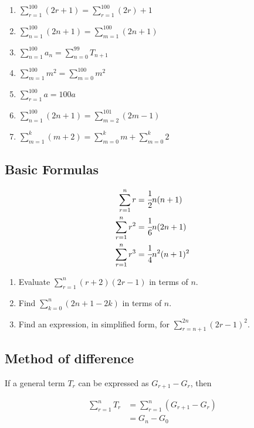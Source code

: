 \documentclass[letterpaper]{article}
\begin{document}
\begin{enumerate}
\item $\sum_{r=1}^{100} (2r + 1) = \sum_{r=1}^{100} (2r) + 1$
\item $\sum_{n=1}^{100} (2n + 1) = \sum_{m=1}^{100} (2n + 1)$
\item $\sum_{n=1}^{100} a_n = \sum_{n=0}^{99} T_{n+1}$
\item $\sum_{m=1}^{100} m^2 = \sum_{m=0}^{100} m^2$
\item $\sum_{r=1}^{100} a = 100a$
\item $\sum_{n=1}^{100} (2n + 1) = \sum_{m=2}^{101} (2m - 1)$
\item $\sum_{m=1}^k (m + 2) = \sum_{m = 0}^k m + \sum_{m=0}^k 2$
\end{enumerate}

\subsection{Basic Formulas}

\begin{align*}
\sum_{r=1}^n r &= \cfrac{1}{2} n (n + 1) \\
\sum_{r=1}^n r^2 &= \cfrac{1}{6} n (2n + 1) \\
\sum_{r=1}^n r^3 &= \cfrac{1}{4} n^2 (n+1)^2
\end{align*}

\begin{enumerate}
\item Evaluate $\sum_{r=1}^n (r+2)(2r - 1)$ in terms of $n$.

\item Find $\sum_{k=0}^n (2n + 1 - 2k)$ in terms of $n$.

\item Find an expression, in simplified form, for $\sum_{r = n+1}^{2n} (2r - 1)^2$.
\end{enumerate}

\subsection{Method of difference}

If a general term $T_r$ can be expressed as $G_{r+1} - G_r$, then

\begin{align*}
\sum_{r=1}^n T_r &= \sum_{r=1}^n (G_{r+1} - G_r) \\
&= G_n - G_0
\end{align*}
\end{document}
